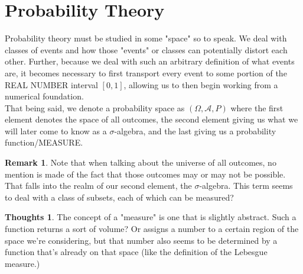 \documentclass[12pt]{book}
\theoremstyle{definition}
\newtheorem*{huh}{Thoughts}
\newtheorem*{remark}{Remark}
\begin{document}
\section{Probability Theory}
Probability theory must be studied in some "space" so to speak. We deal with classes of events and how those "events" or classes can potentially distort each other. Further, because we deal with such an arbitrary definition of what events are, it becomes necessary to first transport every event to some portion of the REAL NUMBER interval $[0, 1]$, allowing us to then begin working from a numerical foundation.\\
That being said, we denote a probability space as $(\Omega, \mathcal{A}, P)$ where the first element denotes the space of all outcomes, the second element giving us what we will later come to know as a $\sigma$-algebra, and the last giving us a probability function/MEASURE.
\begin{remark}
    Note that when talking about the universe of all outcomes, no mention is made of the fact that those outcomes may or may not be possible. That falls into the realm of our second element, the $\sigma$-algebra. This term seems to deal with a class of subsets, each of which can be measured?
\end{remark}
\begin{huh}
    The concept of a "measure" is one that is slightly abstract. Such a function returns a sort of volume? Or assigns a number to a certain region of the space we're considering, but that number also seems to be determined by a function that's already on that space (like the definition of the Lebesgue measure.)
\end{huh}
\end{document}
